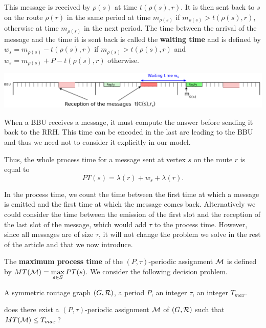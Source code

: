 \documentclass[a4paper,10pt]{article}
\begin{document}
      

      This message is received by $\rho(s)$ at time $t(\rho(s),r)$. It is then sent back to $s$ on the route $\rho(r)$ in the same period at time $m_{\rho(s)}$ if $m_{\rho(s)} > t(\rho(s),r)$, otherwise at time $m_{\rho(s)}$ in the next period. The time between the arrival of the message and the time it is sent back is called the \textbf{waiting time} and is defined by $w_s = m_{\rho(s)} - t(\rho(s),r)$ if $m_{\rho(s)} > t(\rho(s),r)$ and $w_s = m_{\rho(s)} + P - t(\rho(s),r)$ otherwise.
      
       \begin{center}
      \includegraphics[scale=0.3]{BBU2.png}
      \end{center}
     

      When a BBU receives a message, it must compute the answer before sending it back to the RRH. This time can be encoded
      in the last arc leading to the BBU and thus we need not to consider it explicitly in our model.
    
      Thus, the whole process time for a message sent at vertex $s$ on the route $r$ is equal to
      $$
      PT(s)=\lambda(r)+ w_s+\lambda(r).
      $$
      
      In the process time, we count the time between the first time at which a message is emitted and 
      the first time at which the message comes back. Alternatively we could consider the time between the emission of the first slot and the reception of the last slot of the message, which would add $\tau$ to the process time.
      However, since all messages are of size $\tau$, it will not change the problem we solve in the rest of the article and that we now introduce.
      
    The {\bf maximum process time} of the $(P,\tau)$-periodic assignment ${\cal M} $ is defined by $MT({\cal M})=\max\limits_{s \in S} PT(s)$. We consider the following decision problem.


        A symmetric routage graph $(G,{\cal R})$, a period $P$, an integer $\tau$, an integer $T_{max}$.

       does there exist a $(P,\tau)$-periodic assignment ${\cal M}$ of $(G,{\cal R})$ such that $MT({\cal M}) \leq T_{max}$?
\end{document}
